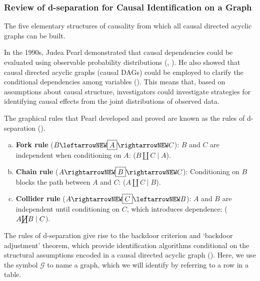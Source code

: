 \documentclass[
  single column]{article}
\begin{document}
\subsubsection{Review of d-separation for Causal Identification on a
Graph}\label{review-of-d-separation-for-causal-identification-on-a-graph}

\begin{table}

\caption{\label{tbl-fiveelementary}The five elementary structures of
causality from which all causal directed acyclic graphs can be built.}

\centering{

\terminologydirectedgraph

}

\end{table}%

In the 1990s, Judea Pearl demonstrated that causal dependencies could be
evaluated using observable probability distributions
(, ).
He also showed that causal directed acyclic graphs (causal DAGs) could
be employed to clarify the conditional dependencies among variables
(). This means that, based on
assumptions about causal structure, investigators could investigate
strategies for identifying causal effects from the joint distributions
of observed data.

The graphical rules that Pearl developed and proved are known as the
rules of d-separation ().

\begin{enumerate}[a)]
     \item  {\bf Fork rule} ($B \leftarrowNEW \boxed{A} \rightarrowNEW C$): $B$ and $C$ are independent when conditioning on $A$: ($B \coprod C \mid A$).
     \item  {\bf Chain rule} ($A \rightarrowNEW \boxed{B} \rightarrowNEW C$): Conditioning on $B$ blocks the path between $A$ and $C$: ($A \coprod C \mid B$).
     \item  {\bf Collider rule} ($A \rightarrowNEW \boxed{C} \leftarrowNEW B$): $A$ and $B$ are independent until conditioning on $C$, which introduces dependence: ($A \cancel{\coprod} B \mid C$). 
 \end{enumerate}

The rules of d-separation give rise to the backdoor criterion and
`backdoor adjustment' theorem, which provide identification algorithms
conditional on the structural assumptions encoded in a causal directed
acyclic graph (). Here, we use the
symbol \(\mathcal{G}\) to name a graph, which we will identify by
referring to a row in a table.
\end{document}
